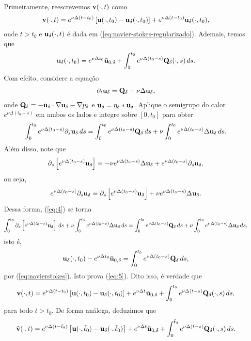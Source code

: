 \begin{prf}
    Primeiramente, reescrevemos $\mathbf{v}(\cdot,t)$ como
    \[
        \mathbf{v}(\cdot,t) = e^{\nu\Delta(t-t_0)} \left[\mathbf{u}(\cdot,t_0) - \mathbf{u}_\delta(\cdot,t_0)\right] + e^{\nu\Delta(t-t_0)}\mathbf{u}_\delta(\cdot,t_0),
    \]
    onde $t > t_0$ e $\mathbf{u}_\delta(\cdot,t)$ é dada em (\ref{eq:navier-stokes-regularizado}).
    Ademais, temos que
    \begin{equation} \label{eq:5}
        \mathbf{u}_\delta(\cdot,t_0) = e^{\nu\Delta t_0}\bar{\mathbf{u}}_{0,\delta} + \int_0^{t_0} e^{\nu\Delta(t_0 - s)}\mathbf{Q}_\delta(\cdot,s)\,ds.
    \end{equation}
    Com efeito, considere a equação
    \[
        \partial_t \mathbf{u}_\delta = \mathbf{Q}_\delta + \nu\Delta\mathbf{u}_\delta,
    \]
    onde $\mathbf{Q}_\delta = - \bar{\mathbf{u}}_\delta \cdot \nabla \mathbf{u}_\delta - \nabla p_\delta$ e $\bar{\mathbf{u}}_\delta = \eta_\delta * \bar{\mathbf{u}}_\delta$.
    Aplique o semigrupo do calor $e^{\nu\Delta(t_0 - s)}$ em ambos os lados e integre sobre $[0,t_0]$ para obter
    \begin{equation} \label{eq:4}
        \int_0^{t_0} e^{\nu\Delta(t_0 - s)} \partial_s \mathbf{u}_\delta \,ds = \int_0^{t_0} e^{\nu\Delta(t_0 - s)}\mathbf{Q}_\delta \,ds + \nu\int_0^{t_0} e^{\nu\Delta(t_0 - s)} \Delta \mathbf{u}_\delta \, ds.
    \end{equation}
    Além disso, note que
    \[
        \partial_s \left[ e^{\nu\Delta(t_0-s)}\mathbf{u}_\delta \right] = -\nu e^{\nu\Delta(t_0 -s)}\Delta\mathbf{u}_\delta + e^{\nu\Delta(t_0 - s)} \partial_s \mathbf{u}_\delta,
    \]
    ou seja,
    \[
        e^{\nu\Delta(t_0 - s)} \partial_s \mathbf{u}_\delta = \partial_s \left[ e^{\nu\Delta(t_0-s)}\mathbf{u}_\delta \right] + \nu e^{\nu\Delta(t_0 -s)}\Delta\mathbf{u}_\delta.
    \]
    Dessa forma, (\ref{eq:4}) se torna
    \[
        \int_0^{t_0}  \partial_s \left[ e^{\nu\Delta(t_0-s)}\mathbf{u}_\delta \right] \,ds + \nu \int_0^{t_0} e^{\nu\Delta(t_0 -s)}\Delta\mathbf{u}_\delta \,ds = \int_0^{t_0} e^{\nu\Delta(t_0 - s)}\mathbf{Q}_\delta \,ds + \nu\int_0^{t_0} e^{\nu\Delta(t_0 - s)} \Delta \mathbf{u}_\delta \,ds,
    \]
    isto é,
    \[
        \mathbf{u}_\delta(\cdot,t_0) - e^{\nu \Delta t_0} \bar{\mathbf{u}}_{0,\delta} = \int_0^{t_0} e^{\nu\Delta(t_0 - s)}\mathbf{Q}_\delta \,ds,
    \]
    por (\ref{eq:navierstokes}). Isto prova (\ref{eq:5}).
    Dito isso, é verdade que
    \[
        \mathbf{v}(\cdot,t) = e^{\nu\Delta(t - t_0)} \left[ \mathbf{u}(\cdot,t_0) - \mathbf{u}_\delta(\cdot,t_0) \right] + e^{\nu\Delta t}\bar{\mathbf{u}}_{0,\delta} + \int_0^{t_0} e^{\nu\Delta(t-s)} \mathbf{Q}_\delta(\cdot,s)\,ds,
    \]
    para todo $t>t_0$. De forma análoga, deduzimos que
    \[
        \tilde{\mathbf{v}}(\cdot,t) = e^{\nu\Delta(t - \tilde t_0)} \left[ \mathbf{u}(\cdot,\tilde t_0) - \mathbf{u}_\delta(\cdot,\tilde t_0) \right] + e^{\nu\Delta t}\bar{\mathbf{u}}_{0,\delta} + \int_0^{\tilde t_0} e^{\nu\Delta(t-s)} \mathbf{Q}_\delta(\cdot,s)\,ds.
\]
\end{prf}
